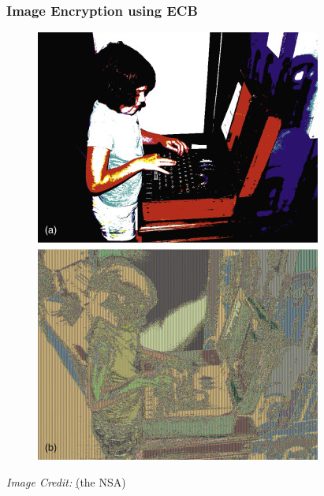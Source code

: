 \documentclass{beamer}
\begin{document}
\begin{frame}
    \frametitle{Image Encryption using ECB}
    \begin{figure}
        \begin{center}
            \includegraphics[scale=0.6]{image_ecb.jpg}
        \end{center}
    \end{figure}
    \textit{Image Credit: }\href{https://www.sciencedirect.com/topics/computer-science/electronic-code-book}(the NSA)
\end{frame}
\end{document}

